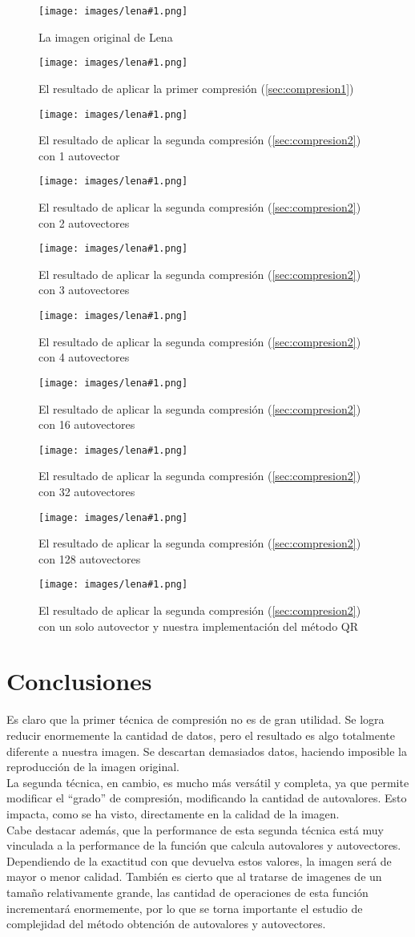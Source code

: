 \documentclass[twocolumn,a4paper,10pt]{article}
\begin{document}
\newcommand{\lena}[2]{
    \begin{figure}[H]
        \label{lena#1}
        \texttt{[image: images/lena\#1.png]}
        \caption{#2}
    \end{figure}
}

\lena{512}{La imagen original de Lena}

\lena{-bruta}{El resultado de aplicar la primer compresi\'on (\ref{sec:compresion1})}

\lena{-eig-1}{El resultado de aplicar la segunda compresi\'on (\ref{sec:compresion2}) con 1 autovector}
\lena{-eig-2}{El resultado de aplicar la segunda compresi\'on (\ref{sec:compresion2}) con 2 autovectores}
\lena{-eig-3}{El resultado de aplicar la segunda compresi\'on (\ref{sec:compresion2}) con 3 autovectores}
\lena{-eig-4}{El resultado de aplicar la segunda compresi\'on (\ref{sec:compresion2}) con 4 autovectores}
\lena{-eig-16}{El resultado de aplicar la segunda compresi\'on (\ref{sec:compresion2}) con 16 autovectores}
\lena{-eig-32}{El resultado de aplicar la segunda compresi\'on (\ref{sec:compresion2}) con 32 autovectores}
\lena{-eig-128}{El resultado de aplicar la segunda compresi\'on (\ref{sec:compresion2}) con 128 autovectores}

\lena{-qr-1}{El resultado de aplicar la segunda compresi\'on (\ref{sec:compresion2}) con un solo autovector y nuestra implementaci\'on del m\'etodo QR}


\section{Conclusiones}

Es claro que la primer t\'ecnica de compresi\'on no es de gran utilidad. Se logra reducir enormemente la cantidad de datos, pero el resultado es algo
totalmente diferente a nuestra imagen. Se descartan demasiados datos, haciendo imposible la reproducci\'on de la imagen original.\\

La segunda t\'ecnica, en cambio, es mucho m\'as vers\'atil y completa, ya que permite modificar el ``grado'' de compresi\'on, modificando la cantidad de 
autovalores. Esto impacta, como se ha visto, directamente en la calidad de la imagen.\\

Cabe destacar adem\'as, que la performance de esta segunda t\'ecnica est\'a muy vinculada a la performance de la funci\'on que calcula autovalores y autovectores.
Dependiendo de la exactitud con que devuelva estos valores, la imagen ser\'a de mayor o menor calidad. Tambi\'en es cierto que al tratarse de imagenes de un tamaño 
relativamente grande, las cantidad de operaciones de esta funci\'on incrementar\'a enormemente, por lo que se torna importante el estudio de complejidad del 
m\'etodo obtenci\'on de autovalores y autovectores.\\ 
\end{document}
